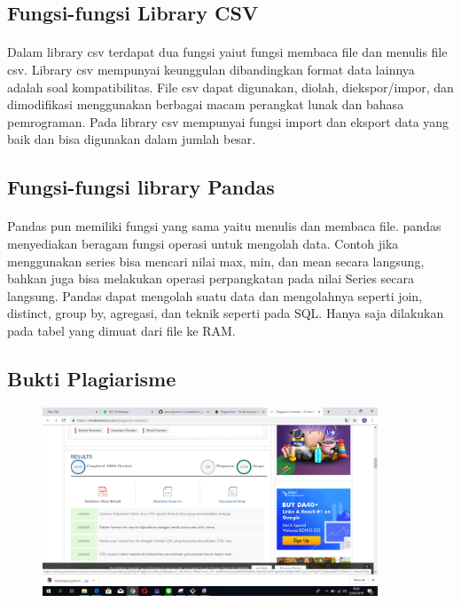 \subsection{Fungsi-fungsi Library CSV}
\paragraph{}Dalam library csv terdapat dua fungsi yaiut fungsi membaca file dan menulis file csv.
Library csv mempunyai keunggulan dibandingkan format data lainnya adalah soal kompatibilitas. File csv dapat digunakan, diolah, diekspor/impor, dan dimodifikasi menggunakan berbagai macam perangkat lunak dan bahasa pemrograman. Pada library csv mempunyai fungsi import dan eksport data yang baik dan bisa digunakan dalam jumlah besar.
\subsection{Fungsi-fungsi library Pandas}
\paragraph{}Pandas pun memiliki fungsi yang sama yaitu menulis dan membaca file. pandas menyediakan beragam fungsi operasi untuk mengolah data. Contoh jika menggunakan series bisa mencari nilai max, min, dan mean secara langsung, bahkan juga bisa melakukan operasi perpangkatan pada nilai Series secara langsung.
Pandas dapat mengolah suatu data dan mengolahnya seperti join, distinct, group by, agregasi, dan teknik seperti pada SQL. Hanya saja dilakukan pada tabel yang dimuat dari file ke RAM.
\subsection{Bukti Plagiarisme}
\begin{figure}[h]
	\includegraphics[width=10cm]{figures/dzihan/bukti.png}
	\centering
\end{figure}

